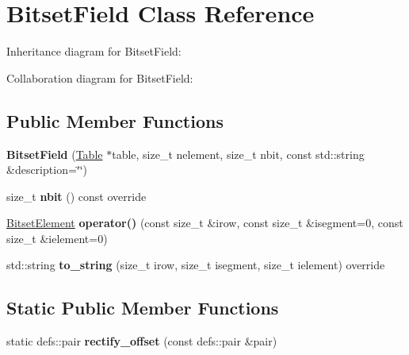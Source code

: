 \hypertarget{classBitsetField}{}\section{Bitset\+Field Class Reference}
\label{classBitsetField}


Inheritance diagram for Bitset\+Field\+:


Collaboration diagram for Bitset\+Field\+:
\subsection*{Public Member Functions}
\begin{DoxyCompactItemize}
\item 
{\bfseries Bitset\+Field} (\hyperlink{classTable}{Table} $\ast$table, size\+\_\+t nelement, size\+\_\+t nbit, const std\+::string \&description=\char`\"{}\char`\"{})\hypertarget{classBitsetField_a63cb4af7c310f66d13eaa3e406083bab}{}\label{classBitsetField_a63cb4af7c310f66d13eaa3e406083bab}

\item 
size\+\_\+t {\bfseries nbit} () const override\hypertarget{classBitsetField_a8e791b6dcc0a47a33eb8f6f0f2a242c9}{}\label{classBitsetField_a8e791b6dcc0a47a33eb8f6f0f2a242c9}

\item 
\hyperlink{classBitsetElement}{Bitset\+Element} {\bfseries operator()} (const size\+\_\+t \&irow, const size\+\_\+t \&isegment=0, const size\+\_\+t \&ielement=0)\hypertarget{classBitsetField_aafbbb0286abfdfae29e12a74bc9d17a7}{}\label{classBitsetField_aafbbb0286abfdfae29e12a74bc9d17a7}

\item 
std\+::string {\bfseries to\+\_\+string} (size\+\_\+t irow, size\+\_\+t isegment, size\+\_\+t ielement) override\hypertarget{classBitsetField_a74210dfe93e12911b41fa22d328555a0}{}\label{classBitsetField_a74210dfe93e12911b41fa22d328555a0}

\end{DoxyCompactItemize}
\subsection*{Static Public Member Functions}
\begin{DoxyCompactItemize}
\item 
static defs\+::pair {\bfseries rectify\+\_\+offset} (const defs\+::pair \&pair)\hypertarget{classBitsetField_a2ed3cd55b88444348643ae5fdd6bb2b4}{}\label{classBitsetField_a2ed3cd55b88444348643ae5fdd6bb2b4}

\end{DoxyCompactItemize}
